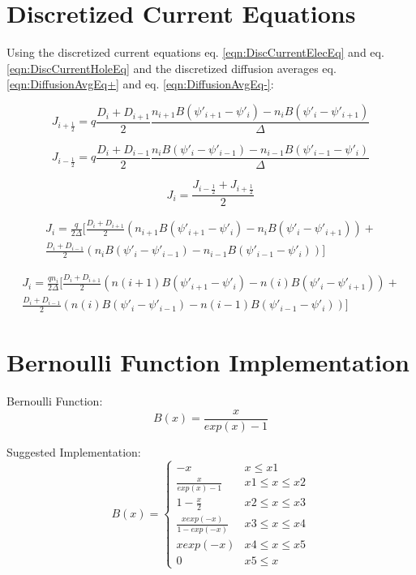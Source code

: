 \documentclass[12pt]{article}
\begin{document}
\section{Discretized Current Equations}
Using the discretized current equations eq. \ref{eqn:DiscCurrentElecEq} and eq. \ref{eqn:DiscCurrentHoleEq} and the discretized diffusion averages eq. \ref{eqn:DiffusionAvgEq+} and eq. \ref{eqn:DiffusionAvgEq-}:

\begin{equation}
J_{i+\frac{1}{2}}=
q \frac{D_{i}+D_{i+1}}{2}
\frac
{n_{i+1}B(\psi'_{i+1}-\psi'_{i})-n_{i}B(\psi'_{i}-\psi'_{i+1})}
{\Delta}
\end{equation}

\begin{equation}
J_{i-\frac{1}{2}}=
q \frac{D_{i}+D_{i-1}}{2}
\frac
{n_{i}B(\psi'_{i}-\psi'_{i-1})-n_{i-1}B(\psi'_{i-1}-\psi'_{i})}
{\Delta}
\end{equation}

\begin{equation}
J_{i}=\frac{J_{i-\frac{1}{2}}+J_{i+\frac{1}{2}}}{2}
\end{equation}

\begin{multline}
J_{i}=
\frac{q}
{2\Delta}
[\frac{D_{i}+D_{i+1}}{2}
(n_{i+1}B(\psi'_{i+1}-\psi'_{i})-n_{i}B(\psi'_{i}-\psi'_{i+1}))
+\\
\frac{D_{i}+D_{i-1}}{2}
(n_{i}B(\psi'_{i}-\psi'_{i-1})-n_{i-1}B(\psi'_{i-1}-\psi'_{i}))
]
\end{multline}

\begin{multline}
J_{i}=
\frac{q n_{i}}
{2\Delta}
[\frac{D_{i}+D_{i+1}}{2}
(n(i+1)B(\psi'_{i+1}-\psi'_{i})-n(i)B(\psi'_{i}-\psi'_{i+1}))
+\\
\frac{D_{i}+D_{i-1}}{2}
(n(i)B(\psi'_{i}-\psi'_{i-1})-n(i-1)B(\psi'_{i-1}-\psi'_{i}))
]
\end{multline}

\section{Bernoulli Function Implementation \cite[p.169] {Selberherr1984}}

Bernoulli Function:
\[
B(x)=\frac{x}{exp(x)-1}
\]

Suggested Implementation:
\[
B(x)=
\begin{cases} 
-x 							&         x	 \leq x1 \\
\frac{x}{exp(x)-1} 			& x1 \leq x  \leq x2 \\
1-\frac{x}{2} 				& x2 \leq x  \leq x3 \\
\frac{x exp(-x)}{1-exp(-x)} & x3 \leq x  \leq x4 \\
xexp(-x)					& x4 \leq x  \leq x5 \\
0							& x5 \leq x
\end{cases}
\]
\end{document}
